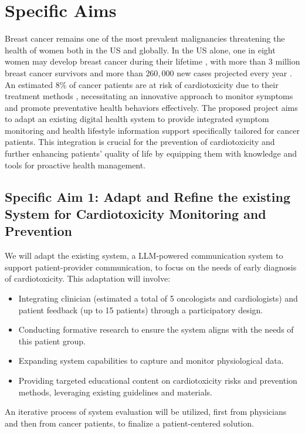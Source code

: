 \documentclass[11pt]{article}
\begin{document}
{
  \hfill
  \textbf{}
  \hfill
}

\section*{Specific Aims}
Breast cancer remains one of the most prevalent malignancies threatening the health of women both in the US and globally. 
In the US alone, one in eight women may develop breast cancer during their lifetime , with more than 3 million breast cancer survivors and more than $260,000$ new cases projected every year \cite{padegimas2020cardioprotective, limaCardiotoxicityCancerPatients2022,beatonCardiacDeathBreast2019}.
An estimated 8\% of cancer patients are at risk of cardiotoxicity due to their treatment methods \cite{limaCardiotoxicityCancerPatients2022}, necessitating an innovative approach to monitor symptoms and promote preventative health behaviors effectively. The proposed project aims to adapt an existing digital health system to provide integrated symptom monitoring and health lifestyle information support specifically tailored for cancer patients. This integration is crucial for the prevention of cardiotoxicity and further enhancing patients' quality of life by equipping them with knowledge and tools for proactive health management.

\vspace{-\baselineskip}
\subsection*{Specific Aim 1: Adapt and Refine the existing System for Cardiotoxicity Monitoring and Prevention} 
We will adapt the existing system, a LLM-powered communication system to support patient-provider communication, to focus on the needs of early diagnosis of cardiotoxicity. This adaptation will involve: 
\begin{itemize}[topsep=0pt,itemsep=0pt,parsep=0pt]
  \item Integrating clinician (estimated a total of 5 oncologists and cardiologists) and patient feedback (up to 15 patients) through a participatory design. 
  \item Conducting formative research to ensure the system aligns with the needs of this patient group. 
  \item Expanding system capabilities to capture and monitor physiological data.
  \item Providing targeted educational content on cardiotoxicity risks and prevention methods, leveraging existing guidelines and materials. 
\end{itemize} 
An iterative process of system evaluation will be utilized, first from physicians and then from cancer patients, to finalize a patient-centered solution.
\end{document}
